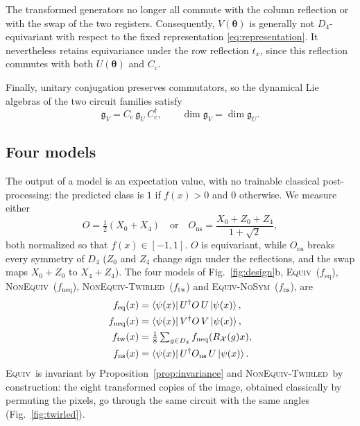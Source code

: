 \documentclass[aps,pra,reprint,superscriptaddress,longbibliography]{revtex4-2}
\newcommand{\Equiv}{\textsc{Equiv}}
\newcommand{\NonEquiv}{\textsc{NonEquiv}}
\newcommand{\Twirled}{\textsc{NonEquiv-Twirled}}
\newcommand{\NoSym}{\textsc{Equiv-NoSym}}
\newcommand{\Ons}{O_{\mathrm{ns}}}
\begin{document}
The transformed generators no longer all commute with the
column reflection or with the swap of the two registers.
Consequently, $V(\boldsymbol\theta)$ is generally not
$D_4$-equivariant with respect to the fixed representation
\eqref{eq:representation}. It nevertheless retains equivariance
under the row reflection $t_x$, since this reflection commutes
with both $U(\boldsymbol\theta)$ and $C_{\mathrm c}$.

Finally, unitary conjugation preserves commutators, so the
dynamical Lie algebras of the two circuit families satisfy
\begin{equation}
\mathfrak g_V
=C_{\mathrm c}\,\mathfrak g_U\,C_{\mathrm c}^\dagger,
\qquad
\dim\mathfrak g_V=\dim\mathfrak g_U.
\label{eq:conjugate_dla}
\end{equation}


\subsection{Four models}\label{subsec:models}

The output of a model is an expectation value, with no trainable classical post-processing: the predicted class is $1$ if $f(x)>0$ and $0$ otherwise. We measure either
\begin{equation}
O=\tfrac12\left(X_0+X_4\right)\quad\text{or}\quad \Ons=\frac{X_0+Z_0+Z_4}{1+\sqrt2},
\label{eq:observables}
\end{equation}
both normalized so that $f(x)\in[-1,1]$. $O$ is equivariant, while $\Ons$ breaks every symmetry of $D_4$ ($Z_0$ and $Z_4$ change sign under the reflections, and the swap maps $X_0+Z_0$ to $X_4+Z_4$). The four models of Fig.~\ref{fig:design}b, \Equiv\ ($f_{\mathrm{eq}}$), \NonEquiv\ ($f_{\mathrm{neq}}$), \Twirled\ ($f_{\mathrm{tw}}$) and \NoSym\ ($f_{\mathrm{ns}}$), are
\begin{equation}
\begin{split}
f_{\mathrm{eq}}(x)&=\bra{\psi(x)}U^\dagger O\,U\ket{\psi(x)},\\
f_{\mathrm{neq}}(x)&=\bra{\psi(x)}V^\dagger O\,V\ket{\psi(x)},\\
f_{\mathrm{tw}}(x)&=\tfrac18\textstyle\sum_{g\in D_4}f_{\mathrm{neq}}(R_\mathcal{X}(g)x),\\
f_{\mathrm{ns}}(x)&=\bra{\psi(x)}U^\dagger \Ons\,U\ket{\psi(x)}.
\end{split}
\label{eq:models}
\end{equation}
\Equiv\ is invariant by Proposition~\ref{prop:invariance} and \Twirled\ by construction: the eight transformed copies of the image, obtained classically by permuting the pixels, go through the same circuit with the same angles (Fig.~\ref{fig:twirled}). 
\end{document}
